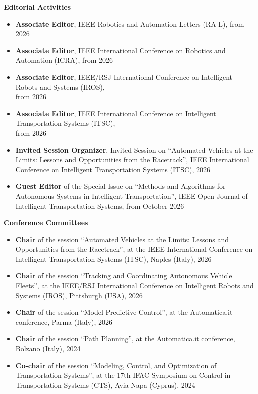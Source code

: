 
\vspace{0.2cm}
{\large\bfseries\sffamily Editorial Activities}

\begin{itemize}
    \item \textbf{Associate Editor}, IEEE Robotics and Automation Letters (RA-L), from 2026
    \item \textbf{Associate Editor}, IEEE International Conference on Robotics and Automation (ICRA), from 2026
    \item \textbf{Associate Editor}, IEEE/RSJ International Conference on Intelligent Robots and Systems (IROS),\\from 2026
    \item \textbf{Associate Editor}, IEEE International Conference on Intelligent Transportation Systems (ITSC),\\from 2026
    \item \textbf{Invited Session Organizer}, Invited Session on ``Automated Vehicles at the Limits: Lessons and Opportunities from the Racetrack'', IEEE International Conference on Intelligent Transportation Systems (ITSC), 2026
    \item \textbf{Guest Editor} of the Special Issue on ``Methods and Algorithms for Autonomous Systems in Intelligent Transportation'', IEEE Open Journal of Intelligent Transportation Systems, from October 2026
\end{itemize}

\vspace{0.2cm}
{\large\bfseries\sffamily Conference Committees}

\begin{itemize}
    \item \textbf{Chair} of the session ``Automated Vehicles at the Limits: Lessons and Opportunities from the Racetrack'', at the IEEE International Conference on Intelligent Transportation Systems (ITSC), Naples (Italy), 2026
    \item \textbf{Chair} of the session ``Tracking and Coordinating Autonomous Vehicle Fleets'', at the IEEE/RSJ International Conference on Intelligent Robots and Systems (IROS), Pittsburgh (USA), 2026
    \item \textbf{Chair} of the session ``Model Predictive Control'', at the Automatica.it conference, Parma (Italy), 2026
    \item \textbf{Chair} of the session ``Path Planning'', at the Automatica.it conference, Bolzano (Italy), 2024
    \item \textbf{Co-chair} of the session ``Modeling, Control, and Optimization of Transportation Systems'', at the 17th IFAC Symposium on Control in Transportation Systems (CTS), Ayia Napa (Cyprus), 2024
\end{itemize}


